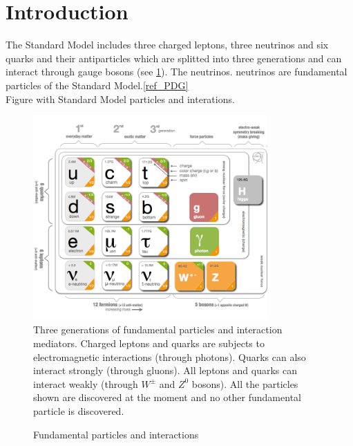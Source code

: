 \section{Introduction}
The Standard Model includes three charged leptons, three neutrinos and six quarks and their antiparticles which are splitted into three generations and can interact through gauge bosons (see \ref{fig:StandardModel}). The neutrinos. neutrinos are fundamental particles of the Standard Model.\ref{ref_PDG}\\
Figure with Standard Model particles and interations. \\

\begin{figure}
\caption{Fundamental particles and interactions}
\label{fig:StandardModel}
\centering
\includegraphics[width=0.8\textwidth, keepaspectratio=true]{figs/StandardModel.png}
\\Three generations of fundamental particles and interaction mediators. Charged leptons and quarks are subjects to electromagnetic interactions (through photons). Quarks can also interact strongly (through gluons). All leptons and quarks can interact weakly (through $W^{\pm}$ and $Z^0$ bosons). All the particles shown are discovered at the moment and no other fundamental particle is discovered. \cite{ref_fig_StandardModel}   
\end{figure}

